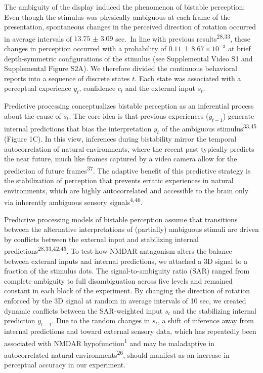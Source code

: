 \documentclass[
]{article}
\begin{document}
The ambiguity of the display induced the phenomenon of bistable
perception: Even though the stimulus was physically ambiguous at each
frame of the presentation, spontaneous changes in the perceived
direction of rotation occurred in average intervals of \(13.75\) ±
\(3.09\) sec.~In line with previous results\textsuperscript{28,33},
these changes in perception occurred with a probability of \(0.11\) ±
\(\ensuremath{8.67\times 10^{-3}}\) at brief depth-symmetric
configurations of the stimulus (see Supplemental Video S1 and
Supplemental Figure S2A). We therefore divided the continuous behavioral
reports into a sequence of discrete states \(t\). Each state was
associated with a perceptual experience \(y_t\), confidence \(c_t\) and
the external input \(s_t\).

Predictive processing conceptualizes bistable perception as an
inferential process about the cause of \(s_t\). The core idea is that
previous experiences (\(y_{t-1}\)) generate internal predictions that
bias the interpretation \(y_t\) of the ambiguous
stimulus\textsuperscript{33,45} (Figure 1C). In this view, inferences
during bistability mirror the temporal autocorrelation of natural
environments, where the recent past typically predicts the near future,
much like frames captured by a video camera allow for the prediction of
future frames\textsuperscript{37}. The adaptive benefit of this
predictive strategy is the stabilization of perception that prevents
erratic experiences in natural environments, which are highly
autocorrelated and accessible to the brain only via inherently ambiguous
sensory signals\textsuperscript{4,46}.

Predictive processing models of bistable perception assume that
transitions between the alternative interpretations of (partially)
ambiguous stimuli are driven by conflicts between the external input and
stabilizing internal predictions\textsuperscript{28,33,42,45}. To test
how NMDAR antagonism alters the balance between external inputs and
internal predictions, we attached a 3D signal to a fraction of the
stimulus dots. The signal-to-ambiguity ratio (SAR) ranged from complete
ambiguity to full disambiguation across five levels and remained
constant in each block of the experiment. By changing the direction of
rotation enforced by the 3D signal at random in average intervals of 10
sec, we created dynamic conflicts between the SAR-weighted input \(s_t\)
and the stabilizing internal prediction \(y_{t-1}\). Due to the random
changes in \(s_t\), a shift of inference away from internal predictions
and toward external sensory data, which has repeatedly been associated
with NMDAR hypofunction\textsuperscript{1} and may be maladaptive in
autocorrelated natural environments\textsuperscript{26}, should manifest
as an increase in perceptual accuracy in our experiment.
\end{document}
